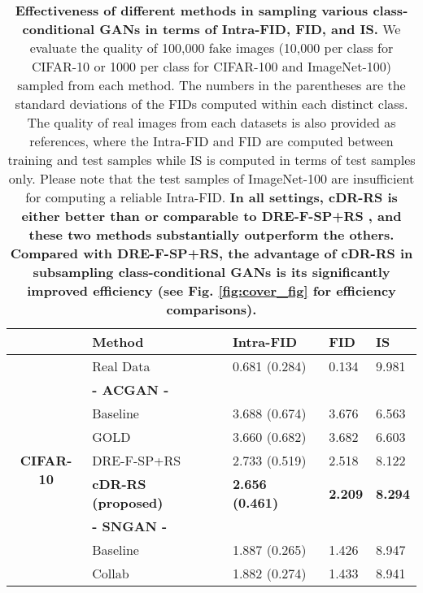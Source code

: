\documentclass[final,12pt, 3p,times]{elsarticle}
\begin{document}
\begin{table}[htbp]
	\centering
	\caption{\textbf{Effectiveness of different methods in sampling various class-conditional GANs in terms of Intra-FID, FID, and IS.} We evaluate the quality of 100,000 fake images (10,000 per class for CIFAR-10 or 1000 per class for CIFAR-100 and ImageNet-100) sampled from each method. The numbers in the parentheses are the standard deviations of the FIDs computed within each distinct class. The quality of real images from each datasets is also provided as references, where the Intra-FID and FID are computed between training and test samples while IS is computed in terms of test samples only. Please note that the test samples of ImageNet-100 are insufficient for computing a reliable Intra-FID. \textbf{In all settings, cDR-RS is either better than or comparable to DRE-F-SP+RS \cite{ding2020subsampling}, and these two methods substantially outperform the others. Compared with DRE-F-SP+RS, the advantage of cDR-RS in subsampling class-conditional GANs is its significantly improved efficiency (see Fig. \ref{fig:cover_fig} for efficiency comparisons). }}
	\begin{adjustbox}{width=0.5\textwidth}
		\begin{tabular}{rllll}
			\toprule
			& \textbf{Method} & \textbf{Intra-FID}  & \textbf{FID}  & \textbf{IS}  \\
			\midrule
			\multicolumn{1}{c}{\multirow{20}[0]{*}{\begin{sideways}\textbf{CIFAR-10}\end{sideways}}} & Real Data & 0.681 (0.284) & 0.134 & 9.981 \\
			\cline{2-5}
			\multicolumn{1}{c}{} & \textbf{- ACGAN -} &       &       &  \\
			\multicolumn{1}{c}{} & Baseline & 3.688 (0.674) & 3.676 & 6.563 \\
			\multicolumn{1}{c}{} & GOLD \cite{mo2019mining} & 3.660 (0.682) & 3.682 & 6.603 \\
			\multicolumn{1}{c}{} & DRE-F-SP+RS \cite{ding2020subsampling} & 2.733 (0.519) & 2.518 & 8.122 \\
			\multicolumn{1}{c}{} & \textbf{cDR-RS (proposed)} & \textbf{2.656 (0.461)} & \textbf{2.209} & \textbf{8.294} \\
			\cline{2-5}
			\multicolumn{1}{c}{} & \textbf{- SNGAN -} &       &       &  \\
			\multicolumn{1}{c}{} & Baseline & 1.887 (0.265) & 1.426 & 8.947 \\
			\multicolumn{1}{c}{} & Collab \cite{liu2020collaborative} & 1.882 (0.274) & 1.433 & 8.941 \\

\end{tabular}
\end{adjustbox}
\end{table}
\end{document}
